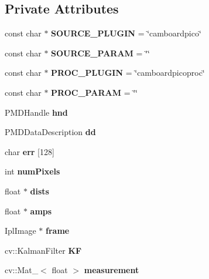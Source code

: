 \subsection*{Private Attributes}
\begin{DoxyCompactItemize}
\item 
\hypertarget{class_p_m_d_camera_ae5c857a614ea51781c690fd862f0e7a2}{}\label{class_p_m_d_camera_ae5c857a614ea51781c690fd862f0e7a2} 
const char $\ast$ {\bfseries S\+O\+U\+R\+C\+E\+\_\+\+P\+L\+U\+G\+IN} = \char`\"{}camboardpico\char`\"{}
\item 
\hypertarget{class_p_m_d_camera_a439b2e8f27acbc26d4de70d9f8a82386}{}\label{class_p_m_d_camera_a439b2e8f27acbc26d4de70d9f8a82386} 
const char $\ast$ {\bfseries S\+O\+U\+R\+C\+E\+\_\+\+P\+A\+R\+AM} = \char`\"{}\char`\"{}
\item 
\hypertarget{class_p_m_d_camera_a1f03b40bf2336e61879fc909490f2829}{}\label{class_p_m_d_camera_a1f03b40bf2336e61879fc909490f2829} 
const char $\ast$ {\bfseries P\+R\+O\+C\+\_\+\+P\+L\+U\+G\+IN} = \char`\"{}camboardpicoproc\char`\"{}
\item 
\hypertarget{class_p_m_d_camera_aef47cd1fda507e9921143f6d0302f5e0}{}\label{class_p_m_d_camera_aef47cd1fda507e9921143f6d0302f5e0} 
const char $\ast$ {\bfseries P\+R\+O\+C\+\_\+\+P\+A\+R\+AM} = \char`\"{}\char`\"{}
\item 
\hypertarget{class_p_m_d_camera_a4422b04aee07aed56b58847d39b2230f}{}\label{class_p_m_d_camera_a4422b04aee07aed56b58847d39b2230f} 
P\+M\+D\+Handle {\bfseries hnd}
\item 
\hypertarget{class_p_m_d_camera_add31d3bba3f20568e45e3dd864a5bda9}{}\label{class_p_m_d_camera_add31d3bba3f20568e45e3dd864a5bda9} 
P\+M\+D\+Data\+Description {\bfseries dd}
\item 
\hypertarget{class_p_m_d_camera_a096946b5bca77dd8fe416c31f850ae75}{}\label{class_p_m_d_camera_a096946b5bca77dd8fe416c31f850ae75} 
char {\bfseries err} \mbox{[}128\mbox{]}
\item 
\hypertarget{class_p_m_d_camera_a0c9627cf393f3055f81c7259c62010f6}{}\label{class_p_m_d_camera_a0c9627cf393f3055f81c7259c62010f6} 
int {\bfseries num\+Pixels}
\item 
\hypertarget{class_p_m_d_camera_a6aa74776638ecb0b1869a1e12734870a}{}\label{class_p_m_d_camera_a6aa74776638ecb0b1869a1e12734870a} 
float $\ast$ {\bfseries dists}
\item 
\hypertarget{class_p_m_d_camera_a315c2931504d25d5b5d882c4b2d9ad26}{}\label{class_p_m_d_camera_a315c2931504d25d5b5d882c4b2d9ad26} 
float $\ast$ {\bfseries amps}
\item 
\hypertarget{class_p_m_d_camera_ad47d6be8f7f11d2772690d3ea36dd432}{}\label{class_p_m_d_camera_ad47d6be8f7f11d2772690d3ea36dd432} 
Ipl\+Image $\ast$ {\bfseries frame}
\item 
\hypertarget{class_p_m_d_camera_ad0d43501bb89e4f24f37e0ba5fa78ae6}{}\label{class_p_m_d_camera_ad0d43501bb89e4f24f37e0ba5fa78ae6} 
cv\+::\+Kalman\+Filter {\bfseries KF}
\item 
\hypertarget{class_p_m_d_camera_ab7536178e056881c11756892c5f0a4b0}{}\label{class_p_m_d_camera_ab7536178e056881c11756892c5f0a4b0} 
cv\+::\+Mat\+\_\+$<$ float $>$ {\bfseries measurement}
\end{DoxyCompactItemize}
